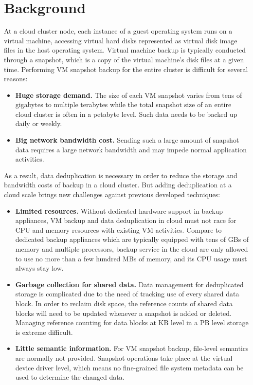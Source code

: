 \chapter{Background}
\label{chap:back}

At a cloud cluster node, each instance of a guest operating 
system runs on a virtual machine, accessing virtual hard disks 
represented as virtual disk image files in the host operating system.
Virtual machine backup is typically conducted through a snapshot,
which is a copy of the virtual machine's disk files at a given time.
Performing VM snapshot backup for the entire cluster is difficult 
for several reasons: 
\begin{itemize}
\item \textbf{Huge storage demand.} The size of each VM snapshot varies from tens of gigabytes to multiple 
terabytes while the total snapshot size of an entire cloud cluster is often  in a petabyte level.
Such data needs to be backed up daily or weekly.
\item \textbf{Big network bandwidth cost.} Sending such a large amount of snapshot data requires
a large network bandwidth and may impede normal application activities.
\end{itemize}

As a result, data deduplication is necessary in order to reduce the storage and bandwidth
costs of backup in a cloud cluster. But adding deduplication at a cloud scale brings new
challenges against previous developed techniques:
\begin{itemize}
\item \textbf{Limited resources.} Without dedicated hardware support in backup appliances, 
VM backup and data deduplication in cloud must not race for CPU and memory resources with
existing VM activities. Compare to dedicated backup appliances which are typically equipped with
tens of GBs of memory and  multiple processors, backup service in the cloud are only allowed to use
no more than a few hundred MBs of memory, and its CPU usage must always stay low.
\item \textbf{Garbage collection for shared data.} Data management for deduplicated storage
is complicated due to the need of tracking use of every shared data block. In order to reclaim
disk space, the reference counts of
shared data blocks will need to be updated whenever a snapshot is added or deleted.
Managing reference counting for data blocks at KB level in a PB level storage is extreme difficult.
\item \textbf{Little semantic information.} For VM snapshot backup, file-level semantics are normally not provided.
Snapshot operations take place at the virtual device driver level, which
means no fine-grained file system metadata can be used to determine the changed data. 
\end{itemize}

